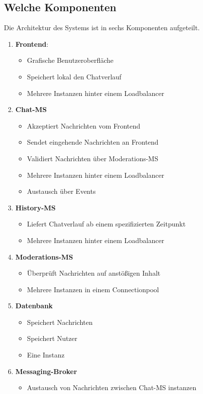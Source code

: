 \documentclass[12pt]{report}
\begin{document}
\subsection{Welche Komponenten}
Die Architektur des Systems ist in sechs Komponenten aufgeteilt. 
\begin{enumerate}
	\item \textbf{Frontend}: 
	\begin{itemize}
		\item Grafische Benutzeroberfläche
		\item Speichert lokal den Chatverlauf
		\item Mehrere Instanzen hinter einem Loadbalancer
	\end{itemize}
	\item \textbf{Chat-MS}
	\begin{itemize}
		\item Akzeptiert Nachrichten vom Frontend
		\item Sendet eingehende Nachrichten an Frontend
		\item Validiert Nachrichten über Moderations-MS
		\item Mehrere Instanzen hinter einem Loadbalancer
		\item Austausch über Events
	\end{itemize}
	\item \textbf{History-MS}
	\begin{itemize}
		\item Liefert Chatverlauf ab einem spezifizierten Zeitpunkt
		\item Mehrere Instanzen hinter einem Loadbalancer
	\end{itemize}
	\item \textbf{Moderations-MS}
	\begin{itemize}
		\item Überprüft Nachrichten auf anstößigen Inhalt
		\item Mehrere Instanzen in einem Connectionpool
	\end{itemize}
	\item \textbf{Datenbank}
	\begin{itemize}
		\item Speichert Nachrichten 
		\item Speichert Nutzer
		\item Eine Instanz
	\end{itemize}
	\item \textbf{Messaging-Broker}
	\begin{itemize}
		\item Austausch von Nachrichten zwischen Chat-MS instanzen
	\end{itemize}
\end{enumerate}
\end{document}
